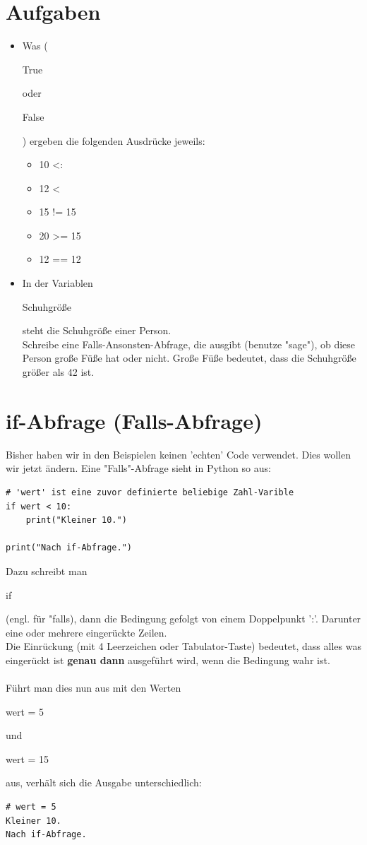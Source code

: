 \documentclass[12pt,a4paper,oneside,ngerman]{scrbook}
\newcommand{\code}[1]{
	\begin{ttfamily}#1\end{ttfamily}
}
\begin{document}
\section{Aufgaben}
\begin{itemize}
	\item Was (\code{True} oder \code{False}) ergeben die folgenden Ausdrücke jeweils:
	\begin{itemize}
		\item 10 \textless{}:
		\item 12 \textless{}
		\item 15 != 15
		\item 20 \textgreater= 15
		\item 12 == 12
	\end{itemize}
	\item In der Variablen \code{Schuhgröße} steht die Schuhgröße einer Person.
	\\
	Schreibe eine Falls-Ansonsten-Abfrage, die ausgibt (benutze "sage"), ob diese Person große Füße hat oder nicht. Große Füße bedeutet, dass die Schuhgröße größer als 42 ist.
\end{itemize}

\clearpage

\section{if-Abfrage (Falls-Abfrage)} Bisher haben wir in den Beispielen keinen 'echten' Code verwendet. Dies wollen wir jetzt ändern.
Eine "Falls"-Abfrage sieht in Python so aus:

\begin{lstlisting}[style=Python, caption='Kleiner'-Vergleich mit einer Variablen]
# 'wert' ist eine zuvor definierte beliebige Zahl-Varible
if wert < 10:
	print("Kleiner 10.")
	
print("Nach if-Abfrage.")
\end{lstlisting}

Dazu schreibt man \code{if} (engl. für "falls), dann die Bedingung gefolgt von einem Doppelpunkt ':'. Darunter eine oder mehrere eingerückte Zeilen.
\\
Die Einrückung (mit 4 Leerzeichen oder Tabulator-Taste) bedeutet, dass alles was eingerückt ist \textbf{genau dann} ausgeführt wird, wenn die Bedingung wahr ist.
\\
\\
Führt man dies nun aus mit den Werten \code{wert = 5} und \code{wert = 15} aus, verhält sich die Ausgabe unterschiedlich:
\begin{lstlisting}[style=Output, caption=Ausgabe für kleineren Wert]
# wert = 5
Kleiner 10.
Nach if-Abfrage.
\end{lstlisting}
\end{document}
